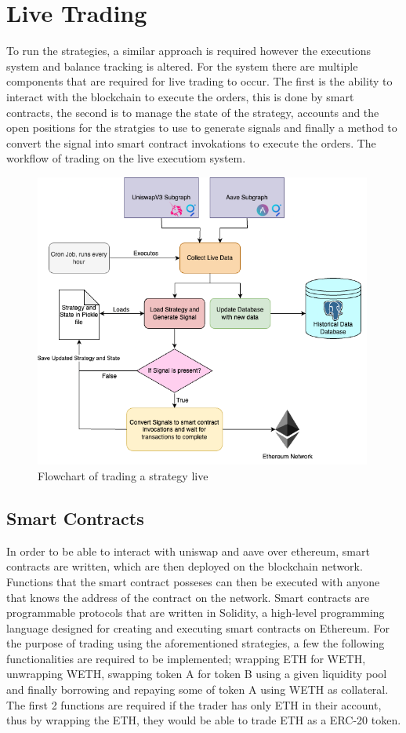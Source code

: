 \section{Live Trading}
To run the strategies, a similar approach is required however the executions system and balance tracking is altered. For the system there are multiple components that are required for live trading to occur. The first is the ability to interact with the blockchain to execute the orders, this is done by smart contracts, the second is to manage the state of the strategy, accounts and the open positions for the stratgies to use to generate signals and finally a method to convert the signal into smart contract invokations to execute the orders. The workflow of trading on the live executiom system.
\begin{figure}[H]
    \centering
    \includegraphics[width=0.99\textwidth]{project/Images/live-trading-system-diagram.png}
    \caption{Flowchart of trading a strategy live \label{fig:live-flow}}
\end{figure}

\subsection{Smart Contracts}
\label{sec:smart-contracts}
In order to be able to interact with uniswap and aave over ethereum, smart contracts are written, which are then deployed on the blockchain network. Functions that the smart contract posseses can then be executed with anyone that knows the address of the contract on the network. Smart contracts are programmable protocols that are written in Solidity, a high-level programming language designed for creating and executing smart contracts on Ethereum. For the purpose of trading using the aforementioned strategies, a few the following functionalities are required to be implemented; wrapping ETH for WETH, unwrapping WETH, swapping token A for token B using a given liquidity pool and finally borrowing and repaying some of token A using WETH as collateral. The first 2 functions are required if the trader has only ETH in their account, thus by wrapping the ETH, they would be able to trade ETH as a ERC-20 token.

